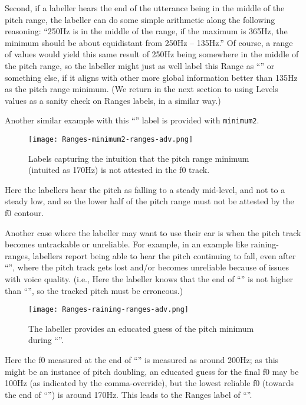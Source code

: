 Second, if a labeller hears the end of the utterance being in the middle of the pitch range, the labeller can do some simple arithmetic along the following reasoning: “250Hz is in the middle of the range, if the maximum is 365Hz, the minimum should be about equidistant from 250Hz – 135Hz.” Of course, a range of values would yield this same result of 250Hz being somewhere in the middle of the pitch range, so the labeller might just as well label this Range as “” or something else, if it aligns with other more global information better than 135Hz as the pitch range minimum. (We return in the next section to using Levels values as a sanity check on Ranges labels, in a similar way.)

Another similar example with this “” label is provided with \texttt{minimum2}.

\begin{figure}[H]
\centering
%
\texttt{[image: Ranges-minimum2-ranges-adv.png]}
%
\caption{Labels capturing the intuition that the pitch range minimum (intuited as 170Hz) is not attested in the f0 track.%
\label{fig:minimum2 Ranges Adv}%
}
\end{figure}

Here the labellers hear the pitch as falling to a steady mid-level, and not to a steady low, and so the lower half of the pitch range must not be attested by the f0 contour.

Another case where the labeller may want to use their ear is when the pitch track becomes untrackable or unreliable. For example, in an example like raining-ranges, labellers report being able to hear the pitch continuing to fall, even after “”, where the pitch track gets lost and/or becomes unreliable because of issues with voice quality. (i.e., Here the labeller knows that the end of “” is not higher than “”, so the tracked pitch must be erroneous.)

\begin{figure}[H]
\centering
%
\texttt{[image: Ranges-raining-ranges-adv.png]}
%
\caption{The labeller provides an educated guess of the pitch minimum during “”.%
\label{fig:raining-ranges Ranges Adv}%
}
\end{figure}

Here the f0 measured at the end of “” is measured as around 200Hz; as this might be an instance of pitch doubling, an educated guess for the final f0 may be 100Hz (as indicated by the comma-override), but the lowest reliable f0 (towards the end of “”) is around 170Hz. This leads to the Ranges label of “”.

